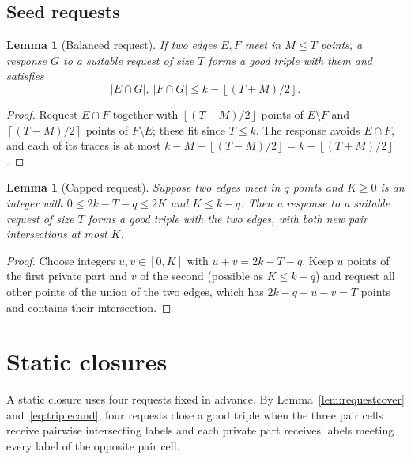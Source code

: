 \documentclass[11pt]{article}
\numberwithin{equation}{section}
\newtheorem{lemma}[theorem]{Lemma}
\theoremstyle{definition}
\theoremstyle{remark}
\newcommand{\ceil}[1]{\left\lceil #1\right\rceil}
\newcommand{\floor}[1]{\left\lfloor #1\right\rfloor}
\begin{document}
\subsection{Seed requests}
\begin{lemma}[Balanced request]\label{lem:balanced}
If two edges $E,F$ meet in $M\le T$ points, a response $G$ to a suitable
request of size $T$ forms a good triple with them and satisfies
\[
 |E\cap G|,\ |F\cap G|\le k-\floor{(T+M)/2}.
\]
\end{lemma}
\begin{proof}
Request $E\cap F$ together with $\floor{(T-M)/2}$ points of $E\setminus F$
and $\ceil{(T-M)/2}$ points of $F\setminus E$; these fit since $T\le k$.
The response avoids $E\cap F$, and each of its traces is at most
$k-M-\floor{(T-M)/2}=k-\floor{(T+M)/2}$.
\end{proof}

\begin{lemma}[Capped request]\label{lem:caps}
Suppose two edges meet in $q$ points and $K\ge0$ is an integer with
$0\le2k-T-q\le2K$ and $K\le k-q$. Then a response to a suitable request
of size $T$ forms a good triple with the two edges, with both new pair
intersections at most $K$.
\end{lemma}
\begin{proof}
Choose integers $u,v\in[0,K]$ with $u+v=2k-T-q$. Keep $u$ points of the
first private part and $v$ of the second (possible as $K\le k-q$) and
request all other points of the union of the two edges, which has
$2k-q-u-v=T$ points and contains their intersection.
\end{proof}

\section{Static closures}\label{sec:static}

A static closure uses four requests fixed in advance. By
Lemma~\ref{lem:requestcover} and~\eqref{eq:triplecand}, four requests
close a good triple when the three pair cells receive pairwise
intersecting labels and each private part receives labels meeting every
label of the opposite pair cell.
\end{document}
